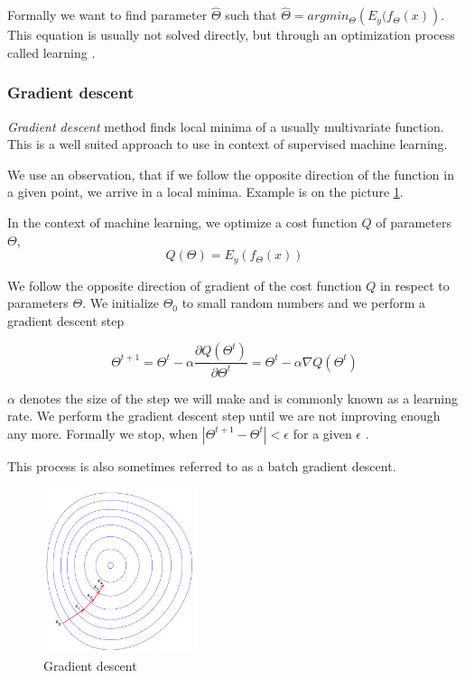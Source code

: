         Formally we want to find parameter $\hat{\Theta}$ such that $\hat{\Theta} = argmin_\Theta \left(E_y(f_\Theta(x) \right)$. 
        This equation is usually not solved directly, but through an optimization process called learning \cite{Goodfellow-et-al-2016}. %
        
        \subsubsection{Gradient descent}

        \textit{Gradient descent} method finds local minima of a usually multivariate function. 
        This is a well suited approach to use in context of supervised machine learning. 
        
        We use an observation, that if we follow the opposite direction of the function in a given point, 
        we arrive in a local minima. Example is on the picture \ref{obr:gradient}.
        
        In the context of machine learning, we optimize a cost function $Q$ of parameters $\Theta$, 
        $$Q(\Theta) = E_y(f_\Theta(x))$$
        
        We follow the opposite direction of gradient of the cost function $Q$ in respect to parameters $\Theta$. 
        We initialize $\Theta_0$ to small random numbers and we perform a gradient descent step
        
        $$\Theta^{t+1} = \Theta^t - \alpha \frac{\partial Q(\Theta^t)}{\partial \Theta^t} = \Theta^t - \alpha \nabla Q(\Theta^t)$$
        
        $\alpha$ denotes the size of the step we will make and is commonly known as a learning rate. 
        We perform the gradient descent step until we are not improving enough any more. 
        Formally we stop, when $|\Theta^{t+1} - \Theta^t| < \epsilon$ for a given $\epsilon$ \cite{bottou-bousquet-2008}.
        
        This process is also sometimes referred to as a batch gradient descent.

        \begin{figure}
        \centerline{\includegraphics[width=0.4\textwidth]{images/gradient_descent}}
        \caption[Gradient descent]{Gradient descent \cite{pict}}
        \label{obr:gradient}
        \end{figure}
        

